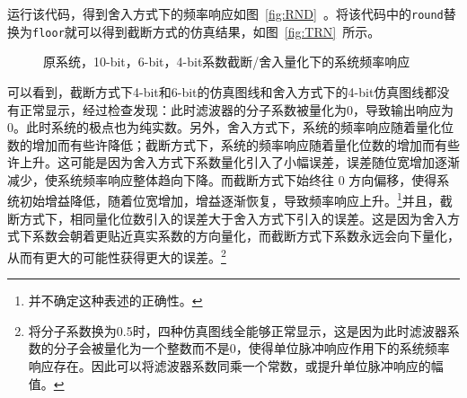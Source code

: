 运行该代码，得到舍入方式下的频率响应如图~\ref{fig:RND}~。将该代码中的\texttt{round}替换为\texttt{floor}就可以得到截断方式的仿真结果，如图~\ref{fig:TRN}~所示。
\begin{figure}[htbp]
  \centering
  \hfill
  \caption{原系统，10-bit，6-bit，4-bit系数截断/舍入量化下的系统频率响应}
\end{figure}

可以看到，截断方式下4-bit和6-bit的仿真图线和舍入方式下的4-bit仿真图线都没有正常显示，经过检查发现：此时滤波器的分子系数被量化为0，导致输出响应为0。此时系统的极点也为纯实数。另外，舍入方式下，系统的频率响应随着量化位数的增加而有些许降低；截断方式下，系统的频率响应随着量化位数的增加而有些许上升。这可能是因为舍入方式下系数量化引入了小幅误差，误差随位宽增加逐渐减少，使系统频率响应整体趋向下降。而截断方式下始终往 0 方向偏移，使得系统初始增益降低，随着位宽增加，增益逐渐恢复，导致频率响应上升。\footnote{并不确定这种表述的正确性。}并且，截断方式下，相同量化位数引入的误差大于舍入方式下引入的误差。这是因为舍入方式下系数会朝着更贴近真实系数的方向量化，而截断方式下系数永远会向下量化，从而有更大的可能性获得更大的误差。\footnote{将分子系数换为0.5时，四种仿真图线全能够正常显示，这是因为此时滤波器系数的分子会被量化为一个整数而不是0，使得单位脉冲响应作用下的系统频率响应存在。因此可以将滤波器系数同乘一个常数，或提升单位脉冲响应的幅值。}


